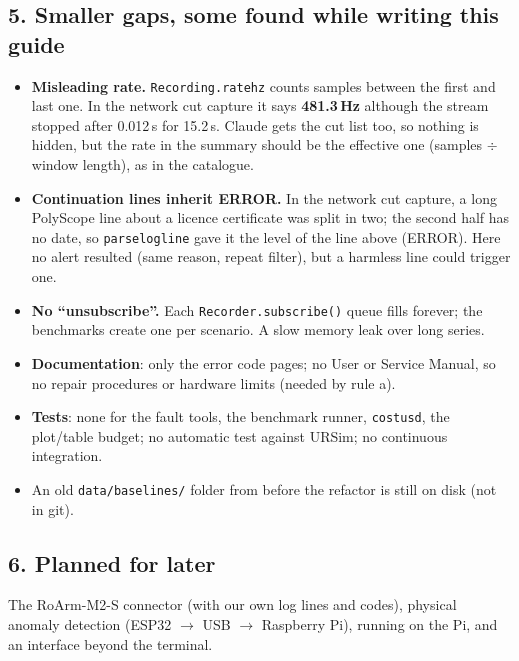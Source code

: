 \documentclass[10pt]{article}
\newcommand{\brkus}{\textunderscore\allowbreak}
\newcommand{\f}[1]{\texttt{\let\_\brkus #1}}
\begin{document}
\subsection{5. Smaller gaps, some found while writing this guide}
\begin{itemize}
\item \textbf{Misleading rate.} \f{Recording.rate\_hz} counts samples between the first and last
one. In the network cut capture it says \textbf{481.3\,Hz} although the stream stopped after
0.012\,s for 15.2\,s. Claude gets the cut list too, so nothing is hidden, but the rate in the
summary should be the effective one (samples \(\div\) window length), as in the catalogue.
\item \textbf{Continuation lines inherit ERROR.} In the network cut capture, a long PolyScope
line about a licence certificate was split in two; the second half has no date, so
\f{parse\_log\_line} gave it the level of the line above (ERROR). Here no alert resulted (same
reason, repeat filter), but a harmless line could trigger one.
\item \textbf{No ``unsubscribe''.} Each \f{Recorder.subscribe()} queue fills forever; the
benchmarks create one per scenario. A slow memory leak over long series.
\item \textbf{Documentation}: only the error code pages; no User or Service Manual, so no repair
procedures or hardware limits (needed by rule a).
\item \textbf{Tests}: none for the fault tools, the benchmark runner, \f{cost\_usd}, the
plot/table budget; no automatic test against URSim; no continuous integration.
\item An old \f{data/baselines/} folder from before the refactor is still on disk (not in git).
\end{itemize}

\subsection{6. Planned for later}
The RoArm-M2-S connector (with our own log lines and codes), physical anomaly detection (ESP32
\(\to\) USB \(\to\) Raspberry Pi), running on the Pi, and an interface beyond the terminal.

\end{document}
